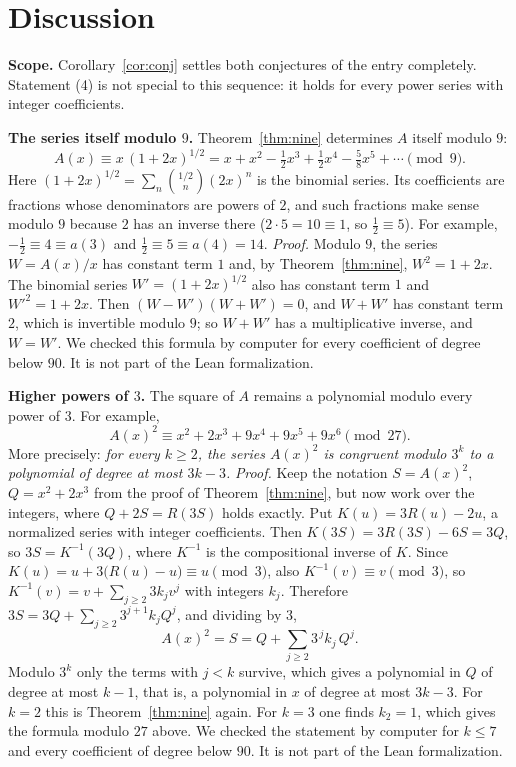 \documentclass[11pt,a4paper]{article}
\theoremstyle{definition}
\theoremstyle{remark}
\newcommand{\para}[1]{\par\medskip\noindent\textbf{#1}\enspace}
\begin{document}
\section{Discussion}\label{sec:discussion}

\para{Scope.} Corollary~\ref{cor:conj} settles both conjectures of the entry completely. Statement (4) is not special to
this sequence: it holds for every power series with integer coefficients.

\para{The series itself modulo $9$.} Theorem~\ref{thm:nine} determines $A$ itself modulo $9$:
\[
A(x)\equiv x\,(1+2x)^{1/2}=x+x^2-\tfrac12x^3+\tfrac12x^4-\tfrac58x^5+\cdots\pmod 9 .
\]
Here $(1+2x)^{1/2}=\sum_n\binom{1/2}{n}(2x)^n$ is the binomial series. Its coefficients are fractions whose
denominators are powers of $2$, and such fractions make sense modulo $9$ because $2$ has an inverse there
($2\cdot5=10\equiv1$, so $\frac12\equiv5$). For example, $-\frac12\equiv4\equiv a(3)$ and $\frac12\equiv5\equiv a(4)=14$.
\emph{Proof.} Modulo $9$, the series $W=A(x)/x$ has constant term $1$ and, by Theorem~\ref{thm:nine}, $W^2=1+2x$. The
binomial series $W'=(1+2x)^{1/2}$ also has constant term $1$ and $W'^2=1+2x$. Then $(W-W')(W+W')=0$, and $W+W'$ has
constant term $2$, which is invertible modulo $9$; so $W+W'$ has a multiplicative inverse, and $W=W'$. We checked this
formula by computer for every coefficient of degree below $90$. It is not part of the Lean formalization.

\para{Higher powers of $3$.} The square of $A$ remains a polynomial modulo every power of $3$. For example,
\[
A(x)^2\equiv x^2+2x^3+9x^4+9x^5+9x^6\pmod{27}.
\]
More precisely: \emph{for every $k\ge2$, the series $A(x)^2$ is congruent modulo $3^k$ to a polynomial of degree at most
$3k-3$.} \emph{Proof.} Keep the notation $S=A(x)^2$, $Q=x^2+2x^3$ from the proof of Theorem~\ref{thm:nine}, but now
work over the integers, where $Q+2S=R(3S)$ holds exactly. Put $K(u)=3R(u)-2u$, a normalized series with integer
coefficients. Then $K(3S)=3R(3S)-6S=3Q$, so $3S=K^{-1}(3Q)$, where $K^{-1}$ is the compositional inverse of $K$. Since
$K(u)=u+3\bigl(R(u)-u\bigr)\equiv u\pmod 3$, also $K^{-1}(v)\equiv v\pmod3$, so
$K^{-1}(v)=v+\sum_{j\ge2}3k_jv^j$ with integers $k_j$. Therefore
$3S=3Q+\sum_{j\ge2}3^{j+1}k_jQ^j$, and dividing by $3$,
\[
A(x)^2=S=Q+\sum_{j\ge2}3^{\,j}k_j\,Q^j .
\]
Modulo $3^k$ only the terms with $j<k$ survive, which gives a polynomial in $Q$ of degree at most $k-1$, that is, a
polynomial in $x$ of degree at most $3k-3$. For $k=2$ this is Theorem~\ref{thm:nine} again. For $k=3$ one finds
$k_2=1$, which gives the formula modulo $27$ above. We checked the statement by computer for $k\le7$ and every coefficient
of degree below $90$. It is not part of the Lean formalization.
\end{document}
